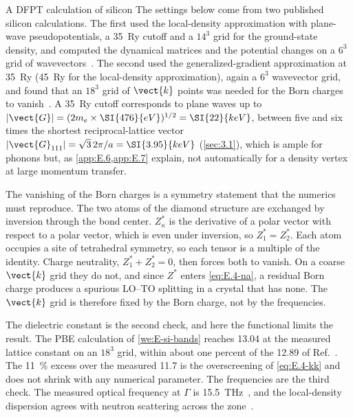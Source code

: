 \begin{workedexample}{A DFPT calculation of silicon}\label{we:E-dfpt-si}
The settings below come from two published silicon calculations. The first used the local-density approximation with plane-wave pseudopotentials, a \SI{35}{Ry} cutoff and a $14^3$ grid for the ground-state density, and computed the dynamical matrices and the potential changes on a $6^3$ grid of wavevectors~\cite{noffsinger2012phonon}. The second used the generalized-gradient approximation at \SI{35}{Ry} (\SI{45}{Ry} for the local-density approximation), again a $6^3$ wavevector grid, and found that an $18^3$ grid of $\vect{k}$ points was needed for the Born charges to vanish~\cite{ponce2018towards}. A \SI{35}{Ry} cutoff corresponds to plane waves up to $|\vect{G}| = (2m_e\times\SI{476}{eV})^{1/2} = \SI{22}{keV}$, between five and six times the shortest reciprocal-lattice vector $|\vect{G}_{111}| = \sqrt3\,2\pi/a = \SI{3.95}{keV}$ (\cref{sec:3.1}), which is ample for phonons but, as \cref{app:E.6,app:E.7} explain, not automatically for a density vertex at large momentum transfer.

The vanishing of the Born charges is a symmetry statement that the numerics must reproduce. The two atoms of the diamond structure are exchanged by inversion through the bond center. $Z^*_\kappa$ is the derivative of a polar vector with respect to a polar vector, which is even under inversion, so $Z^*_1 = Z^*_2$. Each atom occupies a site of tetrahedral symmetry, so each tensor is a multiple of the identity. Charge neutrality, $Z^*_1 + Z^*_2 = 0$, then forces both to vanish. On a coarse $\vect{k}$ grid they do not, and since $Z^*$ enters \cref{eq:E.4-na}, a residual Born charge produces a spurious LO--TO splitting in a crystal that has none. The $\vect{k}$ grid is therefore fixed by the Born charge, not by the frequencies.

The dielectric constant is the second check, and here the functional limits the result. The PBE calculation of \cref{we:E-si-bands} reaches 13.04 at the measured lattice constant on an $18^3$ grid, within about one percent of the 12.89 of Ref.~\cite{ponce2018towards}. The \SI{11}{\percent} excess over the measured 11.7 is the overscreening of \cref{eq:E.4-kk} and does not shrink with any numerical parameter. The frequencies are the third check. The measured optical frequency at $\Gamma$ is \SI{15.5}{THz}~\cite{nilsson1972study}, and the local-density dispersion agrees with neutron scattering across the zone~\cite[Sect.~V.A]{baroni2001phonons}.
\end{workedexample}
